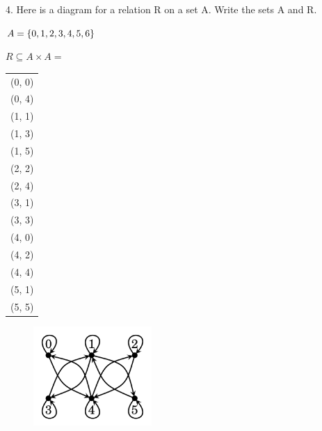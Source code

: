 \documentclass[openany, 12pt]{book}
\begin{document}
\begin{exercise}{}{}
	{4. Here is a diagram for a relation R on a set A. Write the sets A and R.}
	\begin{alist}
		\item $A = \{0, 1, 2, 3, 4, 5, 6\}$
		\item $R\subseteq A\times A =$
		\item
		\begin{tabular}{l}
			(0, 0) \\
			(0, 4) \\
			(1, 1) \\
			(1, 3) \\
			(1, 5) \\
			(2, 2) \\
			(2, 4) \\
			(3, 1) \\
			(3, 3) \\
			(4, 0) \\
			(4, 2) \\
			(4, 4) \\
			(5, 1) \\
			(5, 5)
		\end{tabular}
	\end{alist}
\end{exercise}
\begin{figure}
	\centering
	\includegraphics[width=0.4\textwidth]{images/11-01-04.png}
\end{figure}
\end{document}
